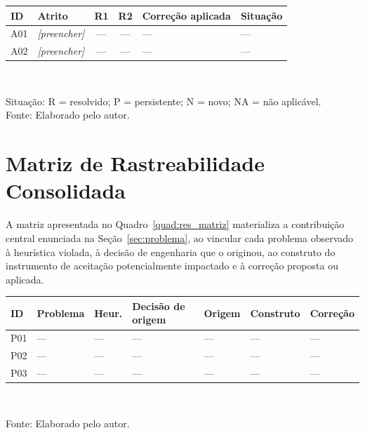 \begin{quadro}[htb]
\centering
\caption{Persistência dos atritos entre as rodadas}
\label{quad:res_comparacao}
\footnotesize
\begin{tabular}{p{1.0cm} p{3.8cm} c c p{2.4cm} p{2.0cm}}
\toprule
\textbf{ID} & \textbf{Atrito} & \textbf{R1} & \textbf{R2} &
\textbf{Correção aplicada} & \textbf{Situação} \\
\midrule
A01 & \textit{[preencher]} & --- & --- & --- & --- \\
A02 & \textit{[preencher]} & --- & --- & --- & --- \\
\bottomrule
\end{tabular}
\\[4pt]
\begin{flushleft}
Situação: R = resolvido; P = persistente; N = novo; NA = não aplicável.\\
Fonte: Elaborado pelo autor.
\end{flushleft}
\end{quadro}


\section{Matriz de Rastreabilidade Consolidada}
\label{sec:res_matriz}

A matriz apresentada no Quadro~\ref{quad:res_matriz} materializa a contribuição
central enunciada na Seção~\ref{sec:problema}, ao vincular cada problema observado
à heurística violada, à decisão de engenharia que o originou, ao construto do
instrumento de aceitação potencialmente impactado e à correção proposta ou
aplicada.

\begin{quadro}[htb]
\centering
\caption{Matriz de rastreabilidade entre atrito, heurística, decisão técnica e construto}
\label{quad:res_matriz}
\scriptsize
\begin{tabular}{p{0.8cm} p{2.4cm} p{1.0cm} p{2.4cm} p{1.2cm} p{1.2cm} p{2.2cm}}
\toprule
\textbf{ID} & \textbf{Problema} & \textbf{Heur.} & \textbf{Decisão de origem} &
\textbf{Origem} & \textbf{Construto} & \textbf{Correção} \\
\midrule
P01 & --- & --- & --- & --- & --- & --- \\
P02 & --- & --- & --- & --- & --- & --- \\
P03 & --- & --- & --- & --- & --- & --- \\
\bottomrule
\end{tabular}
\\[4pt]
\begin{flushleft}
Fonte: Elaborado pelo autor.
\end{flushleft}
\end{quadro}

